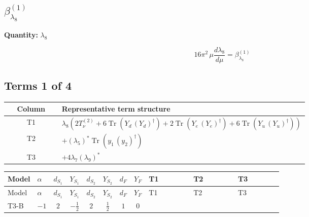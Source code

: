 \documentclass[8pt]{article}
\begin{document}
\begin{landscape}
\section*{$\beta_{\lambda_{8}}^{(1)}$}
\noindent\textbf{Quantity: }$\lambda_{8}$\par\smallskip
\[16\pi^2\,\mu\frac{d \lambda_{8}}{d\mu}=\beta_{\lambda_{8}}^{(1)}\]
\subsection*{Terms 1 of 4}
\begin{center}
\begin{tabular}{@{}c >{\raggedright\arraybackslash}p{0.82\linewidth}@{}}
\toprule
Column & Representative term structure \\
\midrule
T1 & \(\displaystyle {\lambda_8} (2 T_{\nu}^{(2)}+6 \operatorname{Tr}\!\left({Y_d}\,\left({Y_d}\right)^{\dagger}\right)+2 \operatorname{Tr}\!\left({Y_e}\,\left({Y_e}\right)^{\dagger}\right)+6 \operatorname{Tr}\!\left({Y_u}\,\left({Y_u}\right)^{\dagger}\right))\) \\
\midrule
T2 & \(\displaystyle +\left({\lambda_5}\right)^{*} \operatorname{Tr}\!\left({y_1}\,\left({y_2}\right)^{\dagger}\right)\) \\
\midrule
T3 & \(\displaystyle +4 {\lambda_7} \left({\lambda_9}\right)^{*}\) \\
\midrule
\bottomrule
\end{tabular}
\end{center}
\smallskip
\tiny
\begin{longtable}{@{}llcccccc >{\raggedright\arraybackslash}p{0.21\linewidth} >{\raggedright\arraybackslash}p{0.21\linewidth} >{\raggedright\arraybackslash}p{0.21\linewidth}@{}}
\toprule
Model & $\alpha$ & $d_{S_1}$ & $Y_{S_1}$ & $d_{S_2}$ & $Y_{S_2}$ & $d_F$ & $Y_F$ & T1 & T2 & T3 \\
\midrule
\endfirsthead
\toprule
Model & $\alpha$ & $d_{S_1}$ & $Y_{S_1}$ & $d_{S_2}$ & $Y_{S_2}$ & $d_F$ & $Y_F$ & T1 & T2 & T3 \\
\midrule
\endhead
T3-B & $-1$ & $2$ & $-\frac{1}{2}$ & $2$ & $\frac{1}{2}$ & $1$ & $0$ & \scriptsize\adjustbox{max width=\linewidth}{$\begin{gathered} {\lambda_8} (2 T_{\nu}^{(2)}+6 \operatorname{Tr}\!\left({Y_d}\,\left({Y_d}\right)^{\dagger}\right)+2 \operatorname{Tr}\!\left({Y_e}\,\left({Y_e}\right)^{\dagger}\right)+6 \operatorname{Tr}\!\left({Y_u}\,\left({Y_u}\right)^{\dagger}\right))\end{gathered}$} & \scriptsize\adjustbox{max width=\linewidth}{$\begin{gathered} +\left({\lambda_5}\right)^{*} \operatorname{Tr}\!\left({y_1}\,\left({y_2}\right)^{\dagger}\right)\end{gathered}$} & \scriptsize\adjustbox{max width=\linewidth}{$\begin{gathered} +4 {\lambda_7} \left({\lambda_9}\right)^{*}\end{gathered}$} \\

\end{longtable}
\end{landscape}
\end{document}
